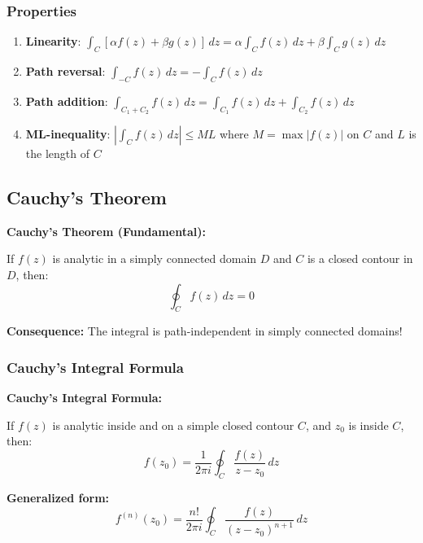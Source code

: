\documentclass[12pt,a4paper]{article}
\begin{document}
\subsubsection{Properties}
\begin{enumerate}
    \item \textbf{Linearity}: $\int_C [\alpha f(z) + \beta g(z)] \, dz = \alpha\int_C f(z) \, dz + \beta\int_C g(z) \, dz$
    \item \textbf{Path reversal}: $\int_{-C} f(z) \, dz = -\int_C f(z) \, dz$
    \item \textbf{Path addition}: $\int_{C_1 + C_2} f(z) \, dz = \int_{C_1} f(z) \, dz + \int_{C_2} f(z) \, dz$
    \item \textbf{ML-inequality}: $\left|\int_C f(z) \, dz\right| \leq ML$ where $M = \max|f(z)|$ on $C$ and $L$ is the length of $C$
\end{enumerate}

\subsection{Cauchy's Theorem}
\begin{importantbox}
\textbf{Cauchy's Theorem (Fundamental):}

If $f(z)$ is analytic in a simply connected domain $D$ and $C$ is a closed contour in $D$, then:
\begin{equation}
\oint_C f(z) \, dz = 0
\end{equation}

\textbf{Consequence:} The integral is path-independent in simply connected domains!
\end{importantbox}

\subsubsection{Cauchy's Integral Formula}
\begin{importantbox}
\textbf{Cauchy's Integral Formula:}

If $f(z)$ is analytic inside and on a simple closed contour $C$, and $z_0$ is inside $C$, then:
\begin{equation}
f(z_0) = \frac{1}{2\pi i} \oint_C \frac{f(z)}{z - z_0} \, dz
\end{equation}

\textbf{Generalized form:}
\begin{equation}
f^{(n)}(z_0) = \frac{n!}{2\pi i} \oint_C \frac{f(z)}{(z - z_0)^{n+1}} \, dz
\end{equation}
\end{importantbox}
\end{document}
